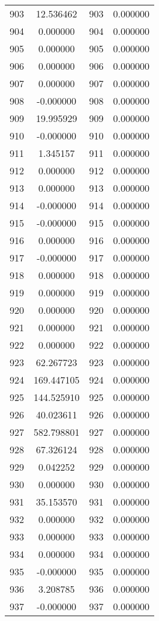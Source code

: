\documentclass[12pt]{article}
\begin{document}
\begin{longtable}{@{}cccc@{}}
903 & 12.536462 & 903 & 0.000000 \\
904 & 0.000000 & 904 & 0.000000 \\
905 & 0.000000 & 905 & 0.000000 \\
906 & 0.000000 & 906 & 0.000000 \\
907 & 0.000000 & 907 & 0.000000 \\
908 & -0.000000 & 908 & 0.000000 \\
909 & 19.995929 & 909 & 0.000000 \\
910 & -0.000000 & 910 & 0.000000 \\
911 & 1.345157 & 911 & 0.000000 \\
912 & 0.000000 & 912 & 0.000000 \\
913 & 0.000000 & 913 & 0.000000 \\
914 & -0.000000 & 914 & 0.000000 \\
915 & -0.000000 & 915 & 0.000000 \\
916 & 0.000000 & 916 & 0.000000 \\
917 & -0.000000 & 917 & 0.000000 \\
918 & 0.000000 & 918 & 0.000000 \\
919 & 0.000000 & 919 & 0.000000 \\
920 & 0.000000 & 920 & 0.000000 \\
921 & 0.000000 & 921 & 0.000000 \\
922 & 0.000000 & 922 & 0.000000 \\
923 & 62.267723 & 923 & 0.000000 \\
924 & 169.447105 & 924 & 0.000000 \\
925 & 144.525910 & 925 & 0.000000 \\
926 & 40.023611 & 926 & 0.000000 \\
927 & 582.798801 & 927 & 0.000000 \\
928 & 67.326124 & 928 & 0.000000 \\
929 & 0.042252 & 929 & 0.000000 \\
930 & 0.000000 & 930 & 0.000000 \\
931 & 35.153570 & 931 & 0.000000 \\
932 & 0.000000 & 932 & 0.000000 \\
933 & 0.000000 & 933 & 0.000000 \\
934 & 0.000000 & 934 & 0.000000 \\
935 & -0.000000 & 935 & 0.000000 \\
936 & 3.208785 & 936 & 0.000000 \\
937 & -0.000000 & 937 & 0.000000 \\

\end{longtable}
\end{document}
